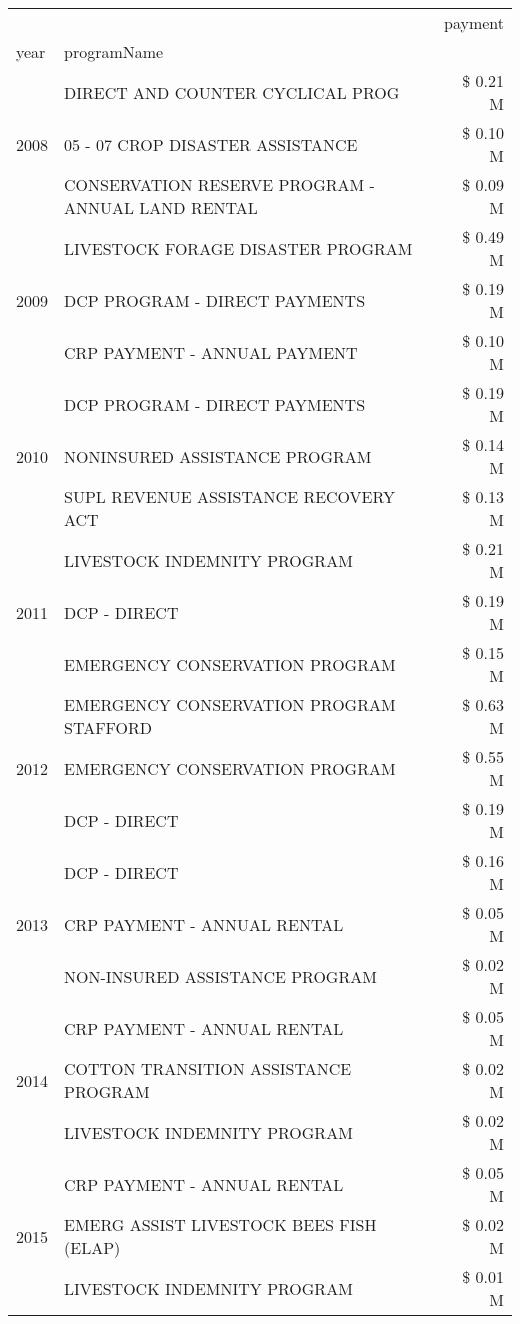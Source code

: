 \begin{tabular}{llr}
\toprule
 &  & payment \\
year & programName &  \\
\midrule
\multirow[t]{3}{*}{2008} & DIRECT AND COUNTER CYCLICAL PROG & \$ 0.21 M \\
 & 05 - 07 CROP DISASTER ASSISTANCE & \$ 0.10 M \\
 & CONSERVATION RESERVE PROGRAM - ANNUAL LAND RENTAL & \$ 0.09 M \\
\cline{1-3}
\multirow[t]{3}{*}{2009} & LIVESTOCK FORAGE DISASTER  PROGRAM & \$ 0.49 M \\
 & DCP PROGRAM - DIRECT PAYMENTS & \$ 0.19 M \\
 & CRP PAYMENT - ANNUAL PAYMENT & \$ 0.10 M \\
\cline{1-3}
\multirow[t]{3}{*}{2010} & DCP PROGRAM - DIRECT PAYMENTS & \$ 0.19 M \\
 & NONINSURED ASSISTANCE PROGRAM & \$ 0.14 M \\
 & SUPL REVENUE ASSISTANCE RECOVERY ACT & \$ 0.13 M \\
\cline{1-3}
\multirow[t]{3}{*}{2011} & LIVESTOCK INDEMNITY PROGRAM & \$ 0.21 M \\
 & DCP - DIRECT & \$ 0.19 M \\
 & EMERGENCY CONSERVATION PROGRAM & \$ 0.15 M \\
\cline{1-3}
\multirow[t]{3}{*}{2012} & EMERGENCY CONSERVATION PROGRAM STAFFORD & \$ 0.63 M \\
 & EMERGENCY CONSERVATION PROGRAM & \$ 0.55 M \\
 & DCP - DIRECT & \$ 0.19 M \\
\cline{1-3}
\multirow[t]{3}{*}{2013} & DCP - DIRECT & \$ 0.16 M \\
 & CRP PAYMENT - ANNUAL RENTAL & \$ 0.05 M \\
 & NON-INSURED ASSISTANCE PROGRAM & \$ 0.02 M \\
\cline{1-3}
\multirow[t]{3}{*}{2014} & CRP PAYMENT - ANNUAL RENTAL & \$ 0.05 M \\
 & COTTON TRANSITION ASSISTANCE PROGRAM & \$ 0.02 M \\
 & LIVESTOCK INDEMNITY PROGRAM & \$ 0.02 M \\
\cline{1-3}
\multirow[t]{3}{*}{2015} & CRP PAYMENT - ANNUAL RENTAL & \$ 0.05 M \\
 & EMERG ASSIST LIVESTOCK BEES FISH (ELAP) & \$ 0.02 M \\
 & LIVESTOCK INDEMNITY PROGRAM & \$ 0.01 M \\
\cline{1-3}

\end{tabular}
